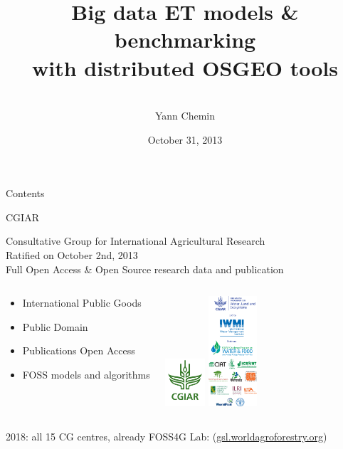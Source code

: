 \documentclass[xcolor=dvipsnames,beamer]{beamer} %
\title[HPC benchmarking ET models OSGEO]
{Big data ET models \& benchmarking\\
with distributed OSGEO tools}
\author[Yann Chemin]
{\vspace{50pt}\\
Yann Chemin}
\institute[IWMI]
{International Water Management Institute\\
 \vspace{5pt}
\begin{flushleft}
 \texttt{[image: ciacanolafield]}
\end{flushleft}
}
\date{\tiny October 31, 2013}
\begin{document}
\frame{
\titlepage
}
\begin{frame}{Contents}
\tableofcontents
\end{frame}


\begin{frame}[fragile]{CGIAR}

Consultative Group for International Agricultural Research\\
Ratified on October 2nd, 2013\\
Full Open Access \& Open Source research data and publication
\newline

\begin{columns}[l]
\begin{center}
\begin{itemize}
 \item International Public Goods
 \item Public Domain
 \item Publications Open Access
 \item FOSS models and algorithms
\end{itemize}
\end{center}

\begin{center}
  \includegraphics[width=1.5cm]{CGIAR_Green}
  \hspace{5mm}
  \includegraphics[width=1.8cm]{WLE_and_partners-vertical_logo_strip.png}
\end{center}
\end{columns}
\vspace{5mm} 2018: all 15 CG centres, already FOSS4G Lab:
(\href{http://gsl.worldagroforestry.org}{gsl.worldagroforestry.org})
\end{frame}
\end{document}

